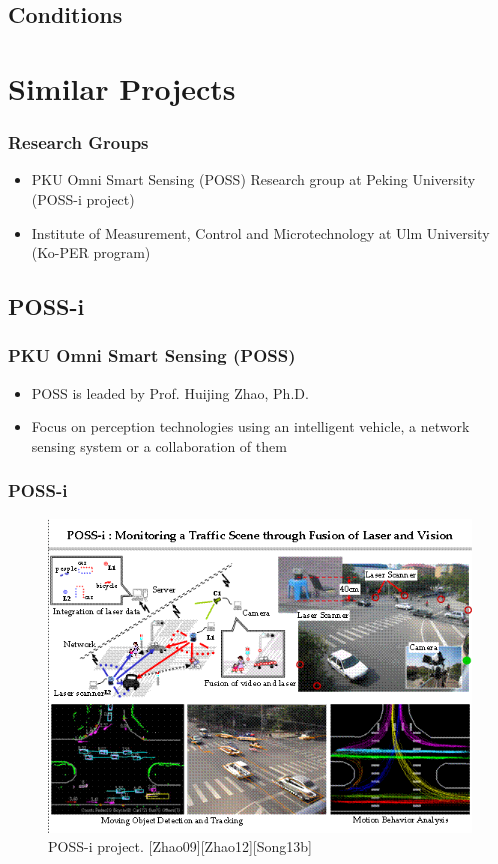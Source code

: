 \documentclass[table]{beamer}
\begin{document}
\subsection{Conditions}


\section{Similar Projects}
\frame
{
	\frametitle{Research Groups}
	\begin{itemize}
		\item PKU Omni Smart Sensing (POSS) Research group at Peking University (POSS-i project)
		\item Institute of Measurement, Control and Microtechnology at Ulm University (Ko-PER program)
	\end{itemize}
}

\subsection{POSS-i}
\frame
{
	\frametitle{PKU Omni Smart Sensing (POSS)}
	\begin{itemize}
		\item POSS is leaded by Prof. Huijing Zhao, Ph.D.
		\item Focus on perception technologies using an intelligent vehicle, a network sensing system or a collaboration of them
	\end{itemize}
}
\frame
{
	\frametitle{POSS-i}	
	\begin{figure}
		\includegraphics[scale=0.4]{fig/possi.png}
		\caption{POSS-i project. [Zhao09][Zhao12][Song13b]}
	\end{figure}
}
\end{document}
